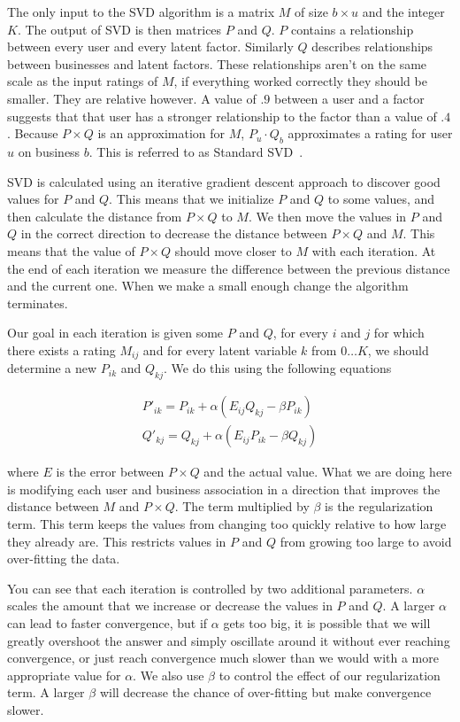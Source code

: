 The only input to the SVD algorithm is a matrix $M$ of size $b \times u$ and the
integer $K$. The output of SVD is then matrices $P$ and $Q$. $P$ contains a
relationship between every user and every latent factor. Similarly $Q$ describes
relationships between businesses and latent factors. These relationships aren't
on the same scale as the input ratings of $M$, if everything worked correctly
they should be smaller. They are relative however. A value of $.9$ between a
user and a factor suggests that that user has a stronger relationship to the
factor than a value of $.4$. Because $P \times Q$ is an approximation for $M$,
$P_u \cdot Q_b$ approximates a rating for user $u$ on business $b$. This is
referred to as Standard SVD~\cite{netflix paper}.

SVD is calculated using an iterative gradient descent approach to discover good
values for $P$ and $Q$. This means that we initialize $P$ and $Q$ to some
values, and then calculate the distance from $P \times Q$ to $M$. We then move
the values in $P$ and $Q$ in the correct direction to decrease the distance
between $P \times Q$ and $M$. This means that the value of $P \times Q$ should
move closer to $M$ with each iteration. At the end of each iteration we measure
the difference between the previous distance and the current one. When we make
a small enough change the algorithm terminates.

Our goal in each iteration is given some $P$ and $Q$, for every $i$ and $j$ for
which there exists a rating $M_{ij}$ and for every latent variable $k$ from
$0\ldots K$, we should determine a new $P_{ik}$ and $Q_{kj}$. We do this using the
following equations

\[
\begin{array}{c}
P'_{ik}=P_{ik} + \alpha(E_{ij}Q_{kj}-\beta P_{ik}) \\
Q'_{kj}=Q_{kj} + \alpha(E_{ij}P_{ik}-\beta Q_{kj})
\end{array}
\]

\noindent where $E$ is the error between $P \times Q$ and the actual value. What
we are doing here is modifying each user and business association in a direction
that improves the distance between $M$ and $P \times Q$. The term multiplied by
$\beta$ is the regularization term. This term keeps the values from changing too
quickly relative to how large they already are. This restricts values in $P$ and
$Q$ from growing too large to avoid over-fitting the data.

You can see that each iteration is controlled by two additional parameters.
$\alpha$ scales the amount that we increase or decrease the values in $P$ and
$Q$. A larger $\alpha$ can lead to faster convergence, but if $\alpha$ gets too
big, it is possible that we will greatly overshoot the answer and simply
oscillate around it without ever reaching convergence, or just reach
convergence much slower than we would with a more appropriate value for
$\alpha$. We also use $\beta$ to control the effect of our regularization term.
A larger $\beta$ will decrease the chance of over-fitting but make convergence
slower.

